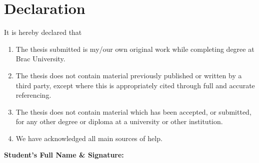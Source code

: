 \newcommand*\wildcard[2][6cm]{\vspace{2cm}\parbox{#1}{\hrulefill\par#2}}

\section*{Declaration}

It is hereby declared that

\begin{enumerate}
  \item The thesis submitted is my/our own original work while completing degree at Brac University.
  \item The thesis does not contain material previously published or written by a third party, except where this is appropriately cited through full and accurate referencing.
  \item The thesis does not contain material which has been accepted, or submitted, for any other degree or diploma at a university or other institution.
  \item We have acknowledged all main sources of help.
\end{enumerate}

\vspace{1cm}
\textbf{Student's Full Name \& Signature:}

\begingroup

    \begin{center}
        \wildcard{\centerline{\StudentOneName} ~\\ \centerline{\StudentOneID}}
        \hspace{2cm}
        \wildcard{\centerline{\StudentTwoName} ~\\ \centerline{\StudentTwoID}}
        \wildcard{\centerline{\StudentThreeName} ~\\ \centerline{\StudentThreeID}}
        \hspace{2cm}
        \wildcard{\centerline{\StudentFourName} ~\\ \centerline{\StudentFourID}}
        \wildcard{\centerline{\StudentFiveName} ~\\ \centerline{\StudentFiveID}}
    \end{center}

\endgroup

\pagebreak
